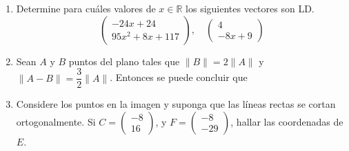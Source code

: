 \documentclass[11pt]{article}
\newcommand{\vect}[2]{\begin{pmatrix}#1\\#2\end{pmatrix}}
\begin{document}
\begin{enumerate}
\item Determine para cuáles valores de $x\in\mathbb{R}$ los siguientes vectores son LD.
$$\vect{-24x+24}{95x^2+8x+117},\quad \vect{4}{-8x+9}$$


\item Sean $A$ y $B$ puntos del plano tales que $\|B\|=2\|A\|$ y $\|A-B\|=\dfrac{3}{2}\|A\|$. Entonces se puede concluir que


\item Considere los puntos en la imagen y suponga que las líneas rectas se cortan ortogonalmente. Si $C=\vect{-8}{16}$, y $F=\vect{-8}{-29}$, hallar las coordenadas de $E$.


\end{enumerate}
\end{document}
